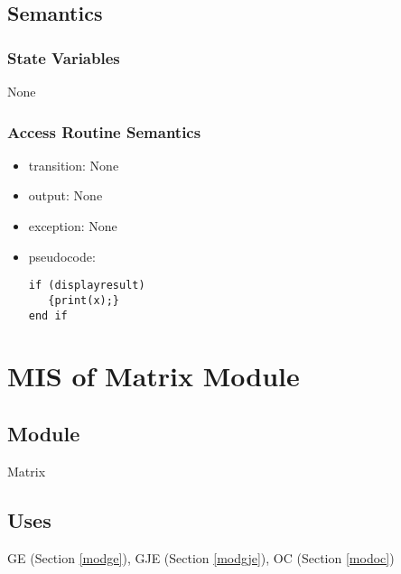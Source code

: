 \documentclass[12pt, titlepage]{article}
\begin{document}

\subsection{Semantics}

\subsubsection{State Variables}

None

\subsubsection{Access Routine Semantics}

\noindent %
\begin{itemize}
\item transition: None%
\item output: None%
\item exception: None%
\item pseudocode: 

\begin{lstlisting}
if (displayresult)
   {print(x);}
end if
\end{lstlisting}

\end{itemize}


\newpage


\section{MIS of {Matrix Module}} \label{modmatrix} %

\subsection{Module}

Matrix


\subsection{Uses}
GE (Section \ref{modge}), GJE (Section \ref{modgje}), OC (Section \ref{modoc})
\end{document}
